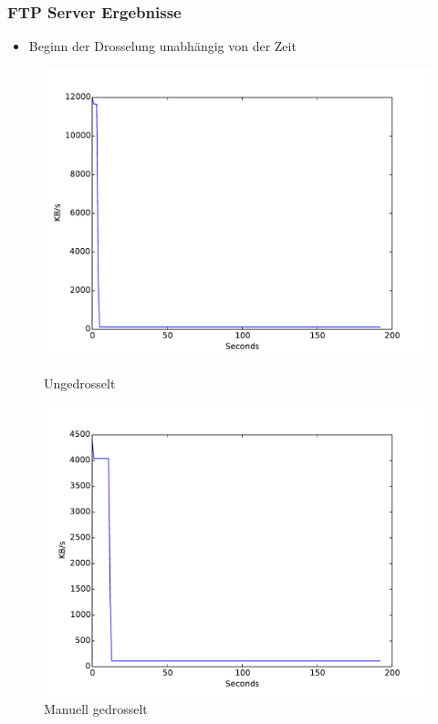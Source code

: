 \documentclass[handout]{beamer}
\begin{document}
\begin{frame}
\frametitle{FTP Server Ergebnisse}
\begin{itemize}
\item Beginn der Drosselung unabhängig von der Zeit
\end{itemize}
\begin{figure}
\centering
\begin{minipage}[t]{0.49\linewidth}
			\centering
			\includegraphics[width=\linewidth]{images/datarate_ftp_cip-unthrottled.pdf}
			\caption{Ungedrosselt}
\end{minipage}
\begin{minipage}[t]{0.49\linewidth}
			\centering
			\includegraphics[width=\linewidth]{images/datarate_ftp_cip-throttled.pdf}
			\caption{Manuell gedrosselt}
\end{minipage}
\end{figure}
\end{frame}
\end{document}
